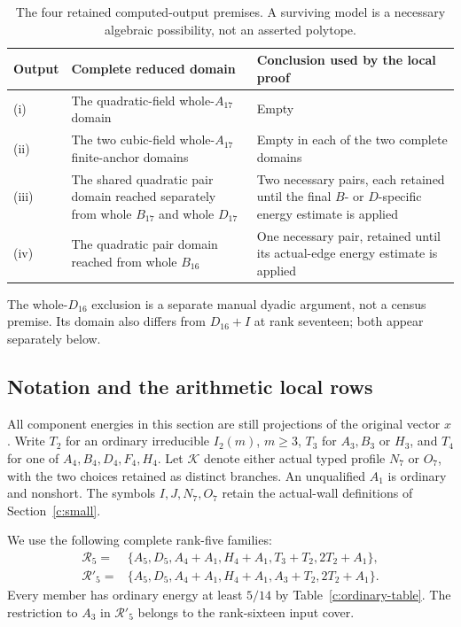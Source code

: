 \begin{table}[htbp]
\centering
\caption{The four retained computed-output premises. A surviving model
is a necessary algebraic possibility, not an asserted polytope.}
\label{a:computed-inputs}
\begin{tabular}{>{\raggedright\arraybackslash}p{.08\linewidth}
 >{\raggedright\arraybackslash}p{.43\linewidth}
 >{\raggedright\arraybackslash}p{.39\linewidth}}
\toprule
Output&Complete reduced domain&Conclusion used by the local proof\\\midrule
(i)&The quadratic-field whole-$A_{17}$ domain&Empty\\
(ii)&The two cubic-field whole-$A_{17}$ finite-anchor domains&Empty
 in each of the two complete domains\\
(iii)&The shared quadratic pair domain reached separately from whole
 $B_{17}$ and whole $D_{17}$&Two necessary pairs, each retained until
 the final $B$- or $D$-specific energy estimate is applied\\
(iv)&The quadratic pair domain reached from whole $B_{16}$&One necessary
 pair, retained until its actual-edge energy estimate is applied\\\bottomrule
\end{tabular}
\end{table}

The whole-$D_{16}$ exclusion is a separate manual dyadic argument,
not a census premise. Its domain also differs from $D_{16}+I$ at
rank seventeen; both appear separately below.

\subsection{Notation and the arithmetic local rows}
\label{a:costs}

All component energies in this section are still projections of the
original vector $x$. Write $T_2$ for an ordinary irreducible $I_2(m)$,
$m\ge3$, $T_3$ for $A_3,B_3$ or $H_3$, and $T_4$ for one of
$A_4,B_4,D_4,F_4,H_4$. Let $\mathcal K$ denote either actual typed profile
$N_7$ or $O_7$, with the two choices retained as distinct branches.
An unqualified $A_1$ is ordinary and nonshort. The symbols $I,J,N_7,O_7$
retain the actual-wall definitions of Section~\ref{c:small}.

We use the following complete rank-five families:
\begin{align*}
\mathcal R_5={}&\{A_5,D_5,A_4+A_1,H_4+A_1,
                   T_3+T_2,2T_2+A_1\},\\
\mathcal R'_5={}&\{A_5,D_5,A_4+A_1,H_4+A_1,
                   A_3+T_2,2T_2+A_1\}.
\end{align*}
Every member has ordinary energy at least $5/14$ by
Table~\ref{c:ordinary-table}. The restriction to $A_3$ in
$\mathcal R'_5$ belongs to the rank-sixteen input cover.

